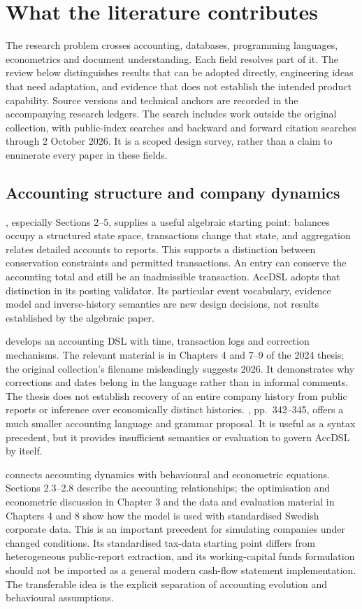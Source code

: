 \chapter{What the literature contributes}
\label{ch:literature}

The research problem crosses accounting, databases, programming languages,
econometrics and document understanding. Each field resolves part of it. The
review below distinguishes results that can be adopted directly, engineering
ideas that need adaptation, and evidence that does not establish the intended
product capability. Source versions and technical anchors are recorded in the
accompanying research ledgers. The search includes work outside the original
collection, with public-index searches and backward and forward citation
searches through 2 October 2026. It is a scoped design survey, rather than a
claim to enumerate every paper in these fields.

\section{Accounting structure and company dynamics}

\citet{nehmer1997}, especially Sections 2--5, supplies a useful algebraic
starting point: balances occupy a structured state space, transactions change
that state, and aggregation relates detailed accounts to reports. This supports
a distinction between conservation constraints and permitted transactions.
An entry can conserve the accounting total and still be an inadmissible
transaction. AccDSL adopts that distinction in its posting validator. Its
particular event vocabulary, evidence model and inverse-history semantics are
new design decisions, not results established by the algebraic paper.

\citet{doshi2024} develops an accounting DSL with time, transaction logs and
correction mechanisms. The relevant material is in Chapters 4 and 7--9 of the
2024 thesis; the original collection's filename misleadingly suggests 2026.
It demonstrates why corrections and dates belong in the language rather than
in informal comments. The thesis does not establish recovery of an entire
company history from public reports or inference over economically distinct
histories. \citet{babcinetchi2022}, pp.~342--345, offers a much smaller accounting
language and grammar proposal. It is useful as a syntax precedent, but it
provides insufficient semantics or evaluation to govern AccDSL by itself.

\citet{shahnazarian2004} connects accounting dynamics with behavioural and
econometric equations. Sections 2.3--2.8 describe the accounting relationships;
the optimisation and econometric discussion in Chapter 3 and the data and
evaluation material in Chapters 4 and 8 show how the model is used with
standardised Swedish corporate data. This is an important precedent for
simulating companies under changed conditions. Its standardised tax-data
starting point differs from heterogeneous public-report extraction, and its
working-capital funds formulation should not be imported as a general modern
cash-flow statement implementation. The transferable idea is the explicit
separation of accounting evolution and behavioural assumptions.


